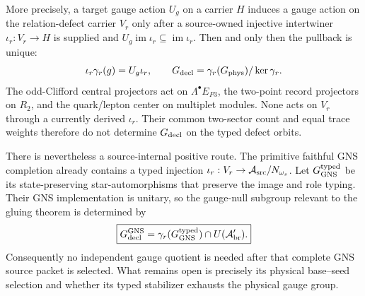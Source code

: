 \documentclass[11pt]{article}
\begin{document}
More precisely, a target gauge action $U_g$ on a carrier $H$ induces a gauge
action on the relation-defect carrier $V_r$ only after a source-owned
injective intertwiner $\iota_r:V_r\to H$ is supplied and
$U_g\operatorname{im}\iota_r\subseteq\operatorname{im}\iota_r$.  Then and
only then the pullback is unique:
\begin{equation}
\iota_r\gamma_r(g)=U_g\iota_r,
\qquad
G_{\rm decl}=\gamma_r(G_{\rm phys})/\ker\gamma_r.
\label{eq:gaugepullback}
\end{equation}
The odd-Clifford central projectors act on $\Lambda^\bullet E_{P3}$, the
two-point record projectors on $R_2$, and the quark/lepton center on multiplet
modules.  None acts on $V_r$ through a currently derived $\iota_r$.  Their
common two-sector count and equal trace weights therefore do not determine
$G_{\rm decl}$ on the typed defect orbits.

There is nevertheless a source-internal positive route.  The primitive
faithful GNS completion already contains a typed injection
$\iota_r:V_r\to\mathcal A_{\rm src}/N_{\omega_s}$.  Let
$G_{\rm GNS}^{\rm typed}$ be its state-preserving star-automorphisms that
preserve the image and role typing.  Their GNS implementation is unitary, so
the gauge-null subgroup relevant to the gluing theorem is determined by
\begin{equation}
\boxed{
G_{\rm decl}^{\rm GNS}
=\gamma_r(G_{\rm GNS}^{\rm typed})\cap U(\mathcal A_{\rm br}').}
\label{eq:gnsgaugecandidate}
\end{equation}
Consequently no independent gauge quotient is needed after that complete GNS
source packet is selected.  What remains open is precisely its physical
base--seed selection and whether its typed stabilizer exhausts the physical
gauge group.
\end{document}

